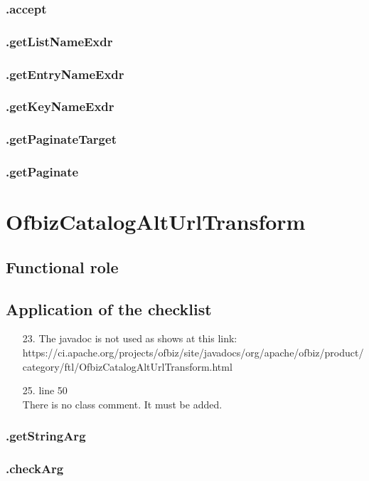 \documentclass[english]{article}
\begin{document}
\subsubsection*{.accept}
\subsubsection*{.getListNameExdr}
\subsubsection*{.getEntryNameExdr}
\subsubsection*{.getKeyNameExdr}
\subsubsection*{.getPaginateTarget}
\subsubsection*{.getPaginate}


\section{OfbizCatalogAltUrlTransform}
	\subsection{Functional role}
	\subsection{Application of the checklist}
\begin{itemize}
	\item[23.]{The javadoc is not used as shows at this link:\\
https://ci.apache.org/projects/ofbiz/site/javadocs/org/apache/ofbiz/product/category/ftl/OfbizCatalogAltUrlTransform.html}
	\item[25.]{line 50\\
There is no class comment. It must be added.
}
\end{itemize}
\subsubsection*{.getStringArg}
\subsubsection*{.checkArg}
\end{document}
